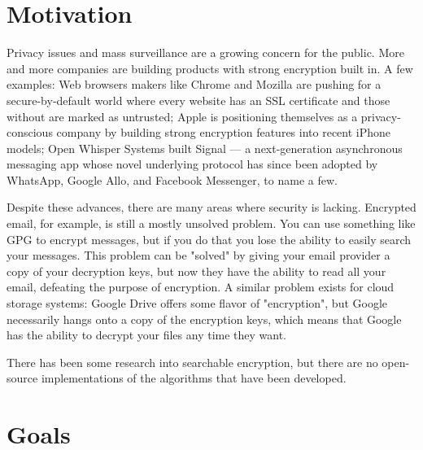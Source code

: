 \documentclass[onecolumn, draftclsnofoot,10pt, compsoc]{IEEEtran}
\begin{document}
\section{Motivation}

Privacy issues and mass surveillance are a growing concern for the public.
More and more companies are building products with strong encryption built in.
A few examples:
Web browsers makers like Chrome and Mozilla are pushing for a secure-by-default world where every website has an SSL certificate and those without are marked as untrusted;
Apple is positioning themselves as a privacy-conscious company by building strong encryption features into recent iPhone models;
Open Whisper Systems built Signal --- a next-generation asynchronous messaging app whose novel underlying protocol has since been adopted by WhatsApp, Google Allo, and Facebook Messenger, to name a few.

Despite these advances, there are many areas where security is lacking.
Encrypted email, for example, is still a mostly unsolved problem.
You can use something like GPG to encrypt messages, but if you do that you lose
the ability to easily search your messages.
This problem can be "solved" by giving your email provider a copy of your decryption keys,
but now they have the ability to read all your email, defeating the purpose of encryption.
A similar problem exists for cloud storage systems:
Google Drive offers some flavor of "encryption", but Google necessarily hangs onto a copy of the encryption keys, which means that Google has the ability to decrypt your files any time they want.


There has been some research into searchable encryption, but there are no open-source implementations of the algorithms that have been developed.




\section{Goals}

\end{document}
